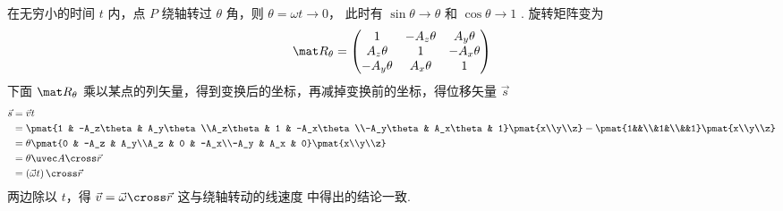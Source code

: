 在无穷小的时间 $t$ 内，点 $P$ 绕轴转过 $\theta $ 角，则 $\theta  = \omega t \to 0$， 此时有 $\sin\theta  \to \theta $ 和 $\cos \theta  \to 1$ . 旋转矩阵变为
\begin{equation}
\mat R_\theta =
\begin{pmatrix}
{1}&{ - {A_z}\theta }&{{A_y}\theta }\\
{{A_z}\theta }&1&{ - {A_x}\theta }\\
{ - {A_y}\theta }&{{A_x}\theta }&1
\end{pmatrix}
\end{equation}
下面 $\mat R_\theta$ 乘以某点的列矢量，得到变换后的坐标，再减掉变换前的坐标，得位移矢量 $\vec s$
\begin{equation}\begin{split}
\vec s &= \vec v t\\
&= \pmat{1 & -A_z\theta & A_y\theta\\A_z\theta & 1 & -A_x\theta\\-A_y\theta & A_x\theta & 1} \pmat{x\\y\\z}
-\pmat{1&&\\&1&\\&&1} \pmat{x\\y\\z}\\
&= \theta \pmat{0 & -A_z & A_y\\A_z & 0 & -A_x\\-A_y & A_x & 0}\pmat{x\\y\\z}\\
&= \theta\uvec A\cross\vec r\\
&= \left(\vec \omega t\right) \cross \vec r
\end{split}\end{equation} 
两边除以 $t$，得 $\vec v = \vec \omega  \cross \vec r$ 这与绕轴转动的线速度%
中得出的结论一致.